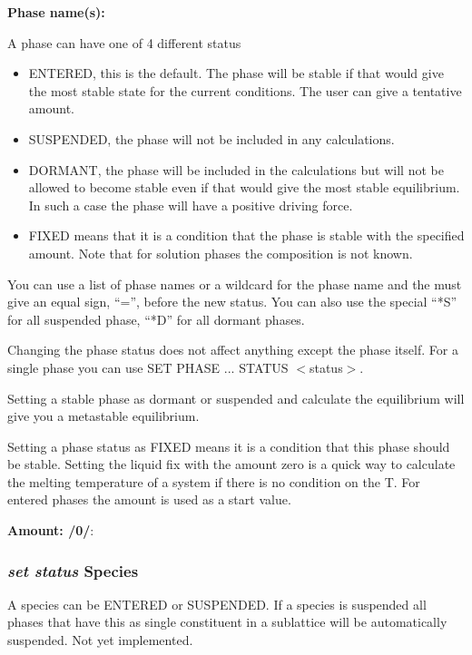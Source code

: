 \documentclass[11pt]{article}
\begin{document}
\hypertarget{Status phase}{{\bf Phase name(s):}}

A phase can have one of 4 different status

\begin{itemize}
\item ENTERED, this is the default.  The phase will be stable if that
  would give the most stable state for the current conditions.  The user
  can give a tentative amount.
\item SUSPENDED, the phase will not be included in any calculations.
\item DORMANT, the phase will be included in the calculations but will
  not be allowed to become stable even if that would give the most
  stable equilibrium.  In such a case the phase will have a positive
  driving force.
\item FIXED means that it is a condition that the phase is stable with
  the specified amount.  Note that for solution phases the composition
  is not known.
\end{itemize}

You can use a list of phase names or a wildcard for the phase name and
the must give an equal sign, ``='', before the new status.  You can
also use the special ``*S'' for all suspended phase, ``*D'' for all
dormant phases.

Changing the phase status does not affect anything except the phase
itself.  For a single phase you can use SET PHASE ... STATUS $<$status$>$.

\hypertarget{Set status phase amount}{}

Setting a stable phase as dormant or suspended and calculate the
equilibrium will give you a metastable equilibrium.

Setting a phase status as FIXED means it is a condition that this
phase should be stable.  Setting the liquid fix with the amount zero
is a quick way to calculate the melting temperature of a system if
there is no condition on the T.  For entered phases the amount is used
as a start value.

{\bf Amount: /0/}:

\hypertarget{Set status species}{}
\subsubsection{{\em set status} Species}

A species can be ENTERED or SUSPENDED.  If a species is suspended
all phases that have this as single constituent in a sublattice
will be automatically suspended.  Not yet implemented.
\end{document}
